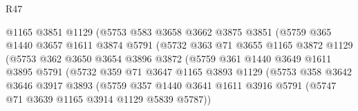 \begin{lexlean}{R47}
\begin{coremodule}
                                @1165
                                @3851
                                @1129
                                (@5753
                                  @583
                                  @3658
                                  @3662
                                  @3875
                                  @3851
                                  (@5759
                                    @365
                                    @1440
                                    @3657
                                    @1611
                                    @3874
                                    @5791
                                    (@5732
                                      @363
                                      @71
                                      @3655
                                      @1165
                                      @3872
                                      @1129
                                      (@5753
                                        @362
                                        @3650
                                        @3654
                                        @3896
                                        @3872
                                        (@5759
                                          @361
                                          @1440
                                          @3649
                                          @1611
                                          @3895
                                          @5791
                                          (@5732
                                            @359
                                            @71
                                            @3647
                                            @1165
                                            @3893
                                            @1129
                                            (@5753
                                              @358
                                              @3642
                                              @3646
                                              @3917
                                              @3893
                                              (@5759
                                                @357
                                                @1440
                                                @3641
                                                @1611
                                                @3916
                                                @5791
                                                (@5747 @71 @3639 @1165 @3914 @1129 @5839 @5787))

\end{coremodule}
\end{lexlean}
